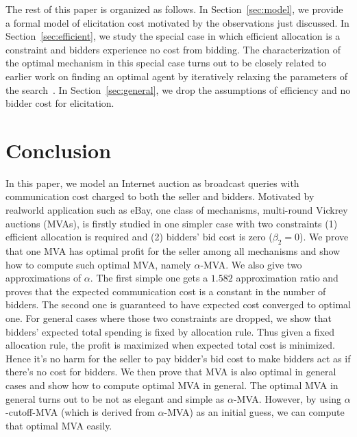 \documentclass{aamas2013}
\begin{document}
The rest of this paper is organized as follows.  In
Section~\ref{sec:model}, we provide a formal model of elicitation cost
motivated by the observations just discussed.  In
Section~\ref{sec:efficient}, we study the special case in which efficient
allocation is a constraint and bidders experience no cost from bidding.
The characterization of the optimal mechanism in this special case turns
out to be closely related to earlier work on finding an optimal agent by
iteratively relaxing the parameters of the search~\cite{}.  In
Section~\ref{sec:general}, we drop the assumptions of efficiency and no
bidder cost for elicitation.















\section{Conclusion}

In this paper, we model an Internet auction as broadcast queries with
communication cost charged to both the seller and bidders. Motivated by
realworld application such as eBay, one class of mechanisms, multi-round
Vickrey auctions (MVAs), is firstly studied in one simpler case with two
constraints (1) efficient allocation is required and (2) bidders' bid cost is
zero ($\beta_2 = 0$).  We prove that one MVA has optimal profit for the seller
among all mechanisms and show how to compute such optimal MVA, namely
$\alpha$-MVA.  We also give two approximations of $\alpha$. The first simple
one gets a $1.582$ approximation ratio and proves that the expected
communication cost is a constant in the number of bidders.  The second one is
guaranteed to have expected cost converged to optimal one. For general cases
where those two constraints are dropped, we show that bidders' expected total
spending is fixed by allocation rule. Thus given a fixed allocation rule, the
profit is maximized when expected total cost is minimized. Hence it's no harm
for the seller to pay bidder's bid cost to make bidders act as if there's no
cost for bidders. We then prove that MVA is also optimal in general cases and
show how to compute optimal MVA in general. The optimal MVA in general turns
out to be not as elegant and simple as $\alpha$-MVA. However, by using
$\alpha$-cutoff-MVA (which is derived from $\alpha$-MVA) as an initial guess,
we can compute that optimal MVA easily.



\end{document}
